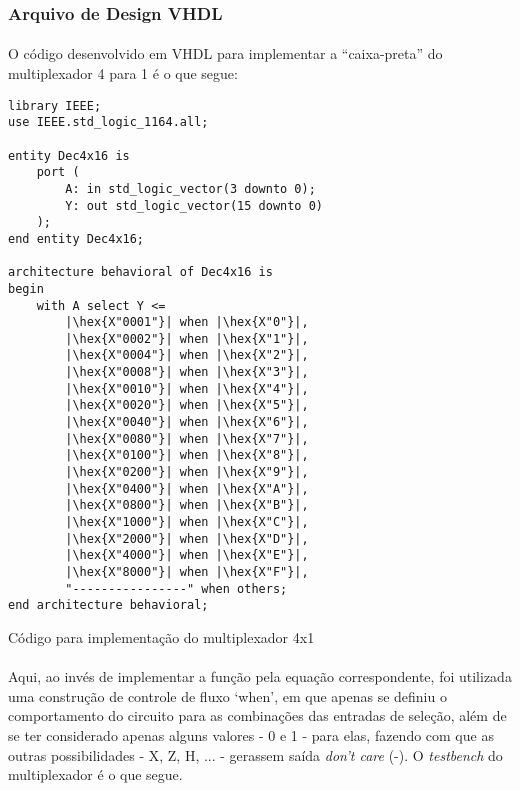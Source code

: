 \documentclass[a4paper,12pt]{article}
\newenvironment{code}{\captionsetup{type=listing}}{}
\newcommand{\hex}[1]{\textcolor{green!50!black}{#1}}
\begin{document}
\subsubsection{Arquivo de Design VHDL}
\paragraph{}
O código desenvolvido em VHDL para implementar a ``caixa-preta'' do multiplexador 4 para 1 é o que segue:

\begin{code}
\begin{verbatim}
library IEEE;
use IEEE.std_logic_1164.all;

entity Dec4x16 is
    port (
        A: in std_logic_vector(3 downto 0);
        Y: out std_logic_vector(15 downto 0)
    );
end entity Dec4x16;

architecture behavioral of Dec4x16 is
begin
    with A select Y <=
        |\hex{X"0001"}| when |\hex{X"0"}|,
        |\hex{X"0002"}| when |\hex{X"1"}|,
        |\hex{X"0004"}| when |\hex{X"2"}|,
        |\hex{X"0008"}| when |\hex{X"3"}|,
        |\hex{X"0010"}| when |\hex{X"4"}|,
        |\hex{X"0020"}| when |\hex{X"5"}|,
        |\hex{X"0040"}| when |\hex{X"6"}|,
        |\hex{X"0080"}| when |\hex{X"7"}|,
        |\hex{X"0100"}| when |\hex{X"8"}|,
        |\hex{X"0200"}| when |\hex{X"9"}|,
        |\hex{X"0400"}| when |\hex{X"A"}|,
        |\hex{X"0800"}| when |\hex{X"B"}|,
        |\hex{X"1000"}| when |\hex{X"C"}|,
        |\hex{X"2000"}| when |\hex{X"D"}|,
        |\hex{X"4000"}| when |\hex{X"E"}|,
        |\hex{X"8000"}| when |\hex{X"F"}|,
        "----------------" when others;
end architecture behavioral;
\end{verbatim}
\caption{Código para implementação do multiplexador 4x1}
\end{code}

\paragraph{}
Aqui, ao invés de implementar a função pela equação correspondente, foi utilizada uma construção de controle de fluxo `when', em que apenas se definiu o comportamento do circuito para as combinações das entradas de seleção, além de se ter considerado apenas alguns valores - 0 e 1 - para elas, fazendo com que as outras possibilidades - X, Z, H, ... - gerassem saída \textit{don't care} (-). O \textit{testbench} do multiplexador é o que segue.
\end{document}
